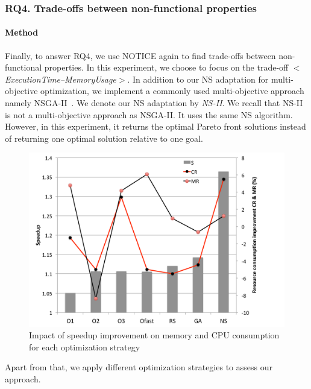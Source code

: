 
\noindent{}
	
	\subsubsection{RQ4. Trade-offs between non-functional properties}
	\paragraph{Method}
	Finally, to answer RQ4, we use NOTICE again to find trade-offs between non-functional properties. In this experiment, we choose to focus on the trade-off \textit{$<$ExecutionTime--MemoryUsage$>$}. In addition to our NS adaptation for multi-objective optimization, we implement a commonly used multi-objective approach namely NSGA-II~\cite{deb2002fast}. We denote our NS adaptation by \textit{NS-II}. We recall that NS-II is not a multi-objective approach as NSGA-II. It uses the same NS algorithm. However, in this experiment, it returns the optimal Pareto front solutions instead of returning one optimal solution relative to one goal. 
	\begin{figure}[h]
		\centering
		\includegraphics[width=0.9\linewidth]{chapitre3/fig/rq3.pdf}
		\caption{Impact of speedup improvement on memory and CPU consumption for each optimization strategy}
	\end{figure}
	Apart from that, we apply different optimization strategies to assess our approach. 
	
